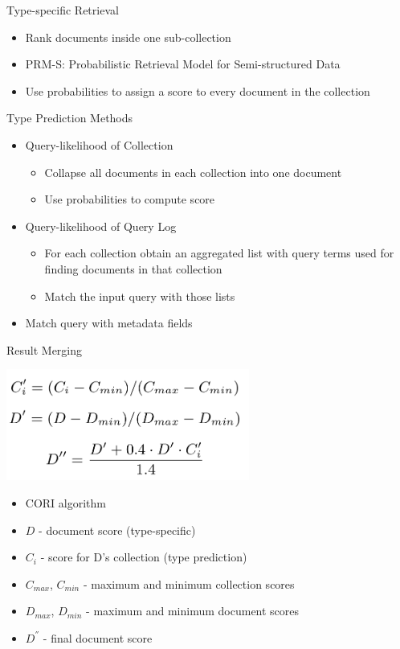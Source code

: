 \begin{frame}{Type-specific Retrieval}
  \begin{itemize}
  \item Rank documents inside one sub-collection
  \item PRM-S: Probabilistic Retrieval Model for Semi-structured Data
  \item Use probabilities to assign a score to every document in the collection
  \end{itemize}
\end{frame}

\begin{frame}{Type Prediction}
  Methods
  \begin{itemize}
    \item Query-likelihood of Collection
      \begin{itemize}
      \item Collapse all documents in each collection into one document
      \item Use probabilities to compute score
      \end{itemize}
    \item Query-likelihood of Query Log
      \begin{itemize}
      \item For each collection obtain an aggregated list with query terms
        used for finding documents in that collection
      \item Match the input query with those lists
      \end{itemize}
    \item Match query with metadata fields
  \end{itemize}
\end{frame}

\begin{frame}{Result Merging}
  \begin{center}
    \includegraphics[width=0.6\textwidth]{img/cori.png}
  \end{center}

  \begin{itemize}
  \item CORI algorithm
  \item $D$ - document score (type-specific)
  \item $C_i$ - score for D's collection (type prediction)
  \item $C_{max}$, $C_{min}$ - maximum and minimum collection scores
  \item $D_{max}$, $D_{min}$ - maximum and minimum document scores
  \item $D^{''}$ - final document score
  \end{itemize}
\end{frame}
